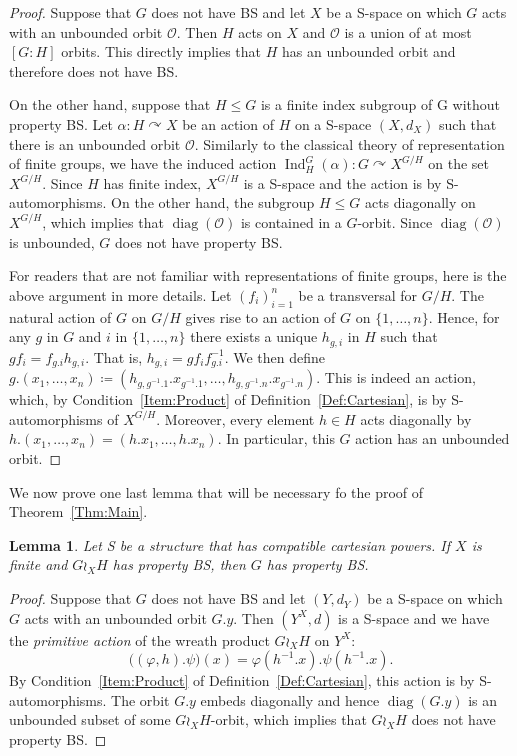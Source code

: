 \documentclass[a4paper]{article}
\newtheorem{lem}{Lemma}[section]
\theoremstyle{definition}
\DeclareMathOperator\Ind{Ind}
\DeclareMathOperator\diag{diag}
\newcommand*{\orbite}{\mathcal O}
\begin{document}
\begin{proof}
Suppose that $G$ does not have BS and let $X$ be a S-space on which $G$ acts with an unbounded orbit $\orbite$.
Then $H$ acts on $X$ and $\orbite$ is a union of at most $[G:H]$ orbits. This directly implies that $H$ has an unbounded orbit and therefore does not have BS.

On the other hand, suppose that $H\leq G$ is a finite index subgroup of G without property BS.
Let $\alpha\colon H\curvearrowright X$ be an action of $H$ on a S-space $(X,d_X)$ such that there is an unbounded orbit $\orbite$.
Similarly to the classical theory of representation of finite groups, we have the induced  action $\Ind_H^G(\alpha)\colon G \curvearrowright X^{G/H}$ on the set $X^{G/H}$. Since $H$ has finite index, $X^{G/H}$ is a S-space and the action is by S-automorphisms. On the other hand, the subgroup $H\leq G$ acts diagonally on $X^{G/H}$, which implies that $\diag(\orbite)$ is contained in a $G$-orbit.
Since $\diag(\orbite)$ is unbounded, $G$ does not have property BS.

For readers that are not familiar with representations of finite groups, here is the above argument in more details.
Let $(f_i)_{i=1}^n$ be a transversal for $G/H$.
The natural action of $G$ on $G/H$ gives rise to an action of $G$ on $\{1,\dots,n\}$.
Hence, for any $g$ in $G$ and $i$ in $\{1,\dots,n\}$ there exists a unique $h_{g,i}$ in $H$ such that $gf_i=f_{g.i}h_{g,i}$. That is, $h_{g,i}=gf_if_{g.i}^{-1}$.
We then define $g.(x_1,\dots,x_n)\coloneqq(h_{g,g^{-1}.1}.x_{g^{-1}.1},\dots,h_{g,g^{-1}.n}.x_{g^{-1}.n})$. This is indeed an action, which, by Condition~\ref{Item:Product} of Definition~\ref{Def:Cartesian}, is by S-automorphisms of $X^{G/H}$.
Moreover, every element $h\in H$ acts diagonally by $h.(x_1,\dots,x_n)=(h.x_1,\dots,h.x_n)$.
In particular, this $G$ action has an unbounded orbit.
\end{proof}
%
%
We now prove one last lemma that will be necessary fo the proof of Theorem~\ref{Thm:Main}.
%
%
\begin{lem}\label{Lemma:Unboundedness}
Let S be a structure that has compatible cartesian powers. If $X$ is finite and $G\wr_XH$ has property BS, then $G$ has property BS.
\end{lem}
\begin{proof}
Suppose that $G$ does not have BS and let $(Y,d_Y)$ be a S-space on which $G$ acts with an unbounded orbit $G.y$.
Then $(Y^X,d)$ is a S-space and we have the \emph{primitive action} of the wreath product $G\wr_XH$ on $Y^X$:
\[
	\bigl((\varphi,h).\psi\bigr)(x)=\varphi(h^{-1}.x).\psi(h^{-1}.x).
\]
By Condition~\ref{Item:Product} of Definition~\ref{Def:Cartesian}, this action is by S-automorphisms.
The orbit $G.y$ embeds diagonally and hence $\diag(G.y)$ is an unbounded subset of some $G\wr_XH$-orbit, which implies that $G\wr_XH$ does not have property BS.
\end{proof}
\end{document}
